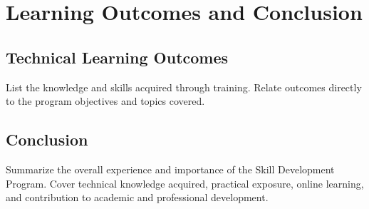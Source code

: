 \chapter{Learning Outcomes and Conclusion}

\section{Technical Learning Outcomes}
List the knowledge and skills acquired through training. Relate outcomes directly to the program objectives and topics covered.

 \section{Conclusion}
Summarize the overall experience and importance of the Skill Development Program. Cover technical knowledge acquired, practical exposure, online learning, and contribution to academic and professional development.
